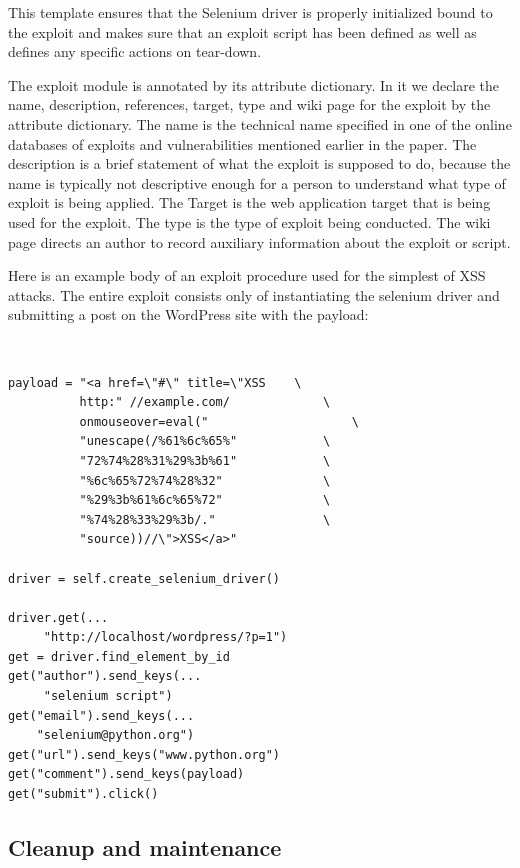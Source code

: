 \documentclass[letterpaper,twocolumn,10pt]{article}
\begin{document}
This template ensures that the Selenium driver is properly initialized bound to the exploit and makes sure that an exploit script has been defined as well as defines any specific actions on tear-down.\par

The exploit module is annotated by its attribute dictionary. In it we declare the name, description, references, target, type and wiki page for the exploit by the attribute dictionary.  The name is the technical name specified in one of the online databases of exploits and vulnerabilities mentioned earlier in the paper.  The description is a brief statement of what the exploit is supposed to do, because the name is typically not descriptive enough for a person to understand what type of exploit is being applied.  The Target is the web application target that is being used for the exploit.  The type is the type of exploit being conducted.  The wiki page directs an author to record auxiliary information about the exploit or script.

Here is an example body of an exploit procedure used for the simplest of XSS attacks.  The entire exploit consists only of instantiating the selenium driver and submitting a post on the WordPress site with the payload: 

\begin{minipage}{\textwidth}
{\tt \footnotesize
\begin{lstlisting}
payload = "<a href=\"#\" title=\"XSS	\
          http:" //example.com/				\
          onmouseover=eval(" 					\
          "unescape(/%61%6c%65%"			\
          "72%74%28%31%29%3b%61"			\
          "%6c%65%72%74%28%32"				\
          "%29%3b%61%6c%65%72"				\
          "%74%28%33%29%3b/." 				\
          "source))//\">XSS</a>"

driver = self.create_selenium_driver()

driver.get(...
     "http://localhost/wordpress/?p=1")
get = driver.find_element_by_id
get("author").send_keys(...
     "selenium script")
get("email").send_keys(...
    "selenium@python.org")
get("url").send_keys("www.python.org")
get("comment").send_keys(payload)
get("submit").click()
\end{lstlisting}
}
\end{minipage}

\subsection {Cleanup and maintenance}
\end{document}
